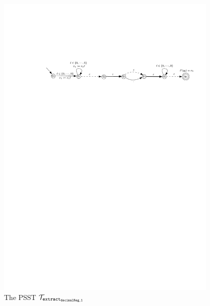 \begin{example}
\vspace{-2mm}
\begin{figure}[ht]
\centering
\includegraphics[width=0.95\textwidth]{psst-epsilon-exmp-new.pdf}
\caption{The PSST $\mathcal{T}_{\tt extract_{decimalReg,1}}$}
\label{fig-psst-exmp}
\vspace{-3mm}
\end{figure}
\end{example}

  
  




